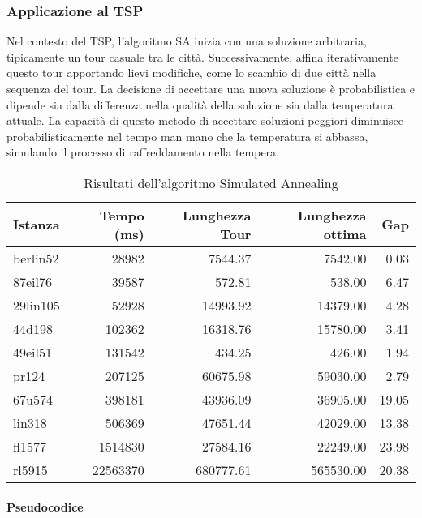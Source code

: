 \subsubsection{Applicazione al \Gls{TSP}}

Nel contesto del \Gls{TSP}, l'algoritmo SA inizia con una soluzione arbitraria, tipicamente un tour casuale tra le città. Successivamente, affina iterativamente questo tour apportando lievi modifiche, come lo scambio di due città nella sequenza del tour. La decisione di accettare una nuova soluzione è probabilistica e dipende sia dalla differenza nella qualità della soluzione sia dalla temperatura attuale. La capacità di questo metodo di accettare soluzioni peggiori diminuisce probabilisticamente nel tempo man mano che la temperatura si abbassa, simulando il processo di raffreddamento nella tempera.


\begin{table}[H] 
  \centering
	\caption{Risultati dell'algoritmo Simulated Annealing}
	\begin{tabular}{lrrrr}
		\toprule
		Istanza  & Tempo (ms) & Lunghezza Tour & Lunghezza ottima & Gap   \\
		\midrule
		berlin52 & 28982      & 7544.37        & 7542.00          & 0.03  \\
		87eil76  & 39587      & 572.81         & 538.00           & 6.47  \\
		29lin105 & 52928      & 14993.92       & 14379.00         & 4.28  \\
		44d198   & 102362     & 16318.76       & 15780.00         & 3.41  \\
		49eil51  & 131542     & 434.25         & 426.00           & 1.94  \\
		pr124    & 207125     & 60675.98       & 59030.00         & 2.79  \\
		67u574   & 398181     & 43936.09       & 36905.00         & 19.05 \\
		lin318   & 506369     & 47651.44       & 42029.00         & 13.38 \\
		fl1577   & 1514830    & 27584.16       & 22249.00         & 23.98 \\
		rl5915   & 22563370   & 680777.61      & 565530.00        & 20.38 \\
		\bottomrule
	\end{tabular}
\end{table}

\paragraph{Pseudocodice}

